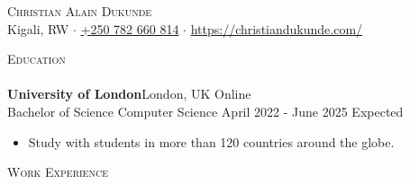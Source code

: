 \documentclass[a4paper]{article}
\newcommand{\lineunder} {
    \vspace*{-8pt} \\
    \hspace*{-18pt} \hrulefill \\
}
\newcommand{\header} [1] {
    {\hspace*{-18pt}\vspace*{6pt} \textsc{#1}}
    \vspace*{-6pt} \lineunder
}
\begin{document}
\vspace*{-40pt}



\vspace*{-10pt}
\begin{center}
	{\Huge \scshape {Christian Alain Dukunde}}\\
	Kigali, RW $\cdot$ \href{tel:+250782660814}{+250 782 660 814} $\cdot$ \url{https://christiandukunde.com/}\\
\end{center}

\header{Education}
\textbf{University of London}\hfill London, UK Online\\
Bachelor of Science Computer Science \hfill April 2022 - June 2025 Expected\\
\begin{itemize} \itemsep 1pt
	\item Study with students in more than 120 countries around the globe.
\end{itemize}
\vspace{2mm}

\header{Work Experience}
\vspace{1mm}
\end{document}
